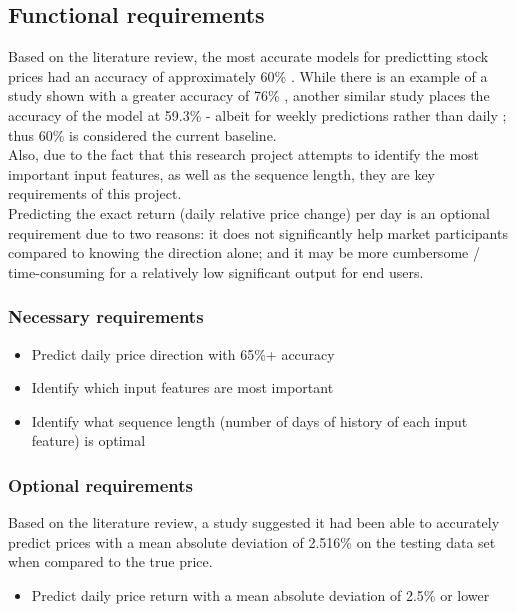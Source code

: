\subsection{Functional requirements}
Based on the literature review, the most accurate models for predictting stock prices had an accuracy of
approximately 60\% \parencite{zhong2019predicting}. While there is an example of a study shown with a greater
accuracy of 76\% \parencite{shen2012stock}, another similar study places the accuracy of the model at 59.3\%
- albeit for weekly predictions rather than daily \parencite{hao_gao_2020}; thus 60\% is considered the
current baseline.\\
Also, due to the fact that this research project attempts to identify the most important input features, as
well as the sequence length, they are key requirements of this project.\\
Predicting the exact return (daily relative price change) per day is an optional requirement due to two
reasons: it does not significantly help market participants compared to knowing the direction alone; and
it may be more cumbersome / time-consuming for a relatively low significant output for end users.
\subsubsection{Necessary requirements}
\begin{itemize}
    \item Predict daily price direction with 65\%+ accuracy
    \item Identify which input features are most important
    \item Identify what sequence length (number of days of history of each input feature) is optimal
\end{itemize}
\subsubsection{Optional requirements}
Based on the literature review, a study suggested it had been able to accurately predict prices with a mean
absolute deviation of 2.516\% on the testing data set when compared to the true price.
\begin{itemize}
    \item Predict daily price return with a mean absolute deviation of 2.5\% or lower
\end{itemize}
